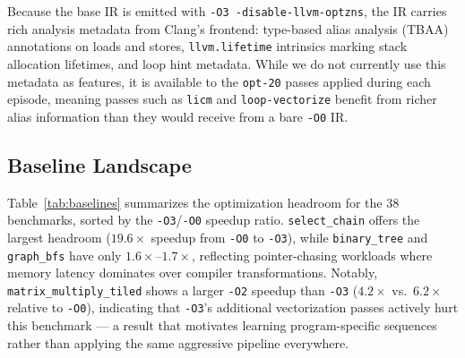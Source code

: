 \documentclass[conference]{IEEEtran}
\begin{document}
Because the base IR is emitted with \texttt{-O3 -disable-llvm-optzns}, the IR
carries rich analysis metadata from Clang's frontend: type-based alias analysis
(TBAA) annotations on loads and stores, \texttt{llvm.lifetime} intrinsics
marking stack allocation lifetimes, and loop hint metadata.  While we do not
currently use this metadata as features, it is available to the \texttt{opt-20}
passes applied during each episode, meaning passes such as \texttt{licm} and
\texttt{loop-vectorize} benefit from richer alias information than they would
receive from a bare \texttt{-O0} IR.

\subsection{Baseline Landscape}

Table~\ref{tab:baselines} summarizes the optimization headroom for the 38
benchmarks, sorted by the \texttt{-O3}/\texttt{-O0} speedup ratio.
\texttt{select\_chain} offers the largest headroom ($19.6\times$ speedup from
\texttt{-O0} to \texttt{-O3}), while \texttt{binary\_tree} and
\texttt{graph\_bfs} have only $1.6\times$--$1.7\times$, reflecting
pointer-chasing workloads where memory latency dominates over compiler
transformations.  Notably, \texttt{matrix\_multiply\_tiled} shows a larger
\texttt{-O2} speedup than \texttt{-O3} ($4.2\times$ vs.\ $6.2\times$ relative
to \texttt{-O0}), indicating that \texttt{-O3}'s additional vectorization
passes actively hurt this benchmark --- a result that motivates learning
program-specific sequences rather than applying the same aggressive pipeline
everywhere.
\end{document}
